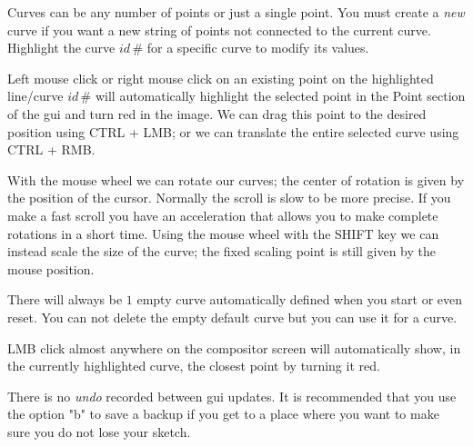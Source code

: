 Curves can be any number of points or just a single point.
You must create a \textit{new} curve if you want a new string of points not connected to the current curve.
Highlight the curve $id\,\#$ for a specific curve to modify its values.
{Left mouse click or right mouse click on an existing point on the highlighted line/curve $id\,\#$ will automatically highlight the selected point in the Point section of the gui and turn red in the image. We can drag this point to the desired position using CTRL + LMB; or we can translate the entire selected curve using CTRL + RMB.
	
With the mouse wheel we can rotate our curves; the center of rotation is given by the position of the cursor. Normally the scroll is slow to be more precise. If you make a fast scroll you have an acceleration that allows you to make complete rotations in a short time. Using the mouse wheel with the SHIFT key we can instead scale the size of the curve; the fixed scaling point is still given by the mouse position. 

There will always be $1$ empty curve automatically defined when you start or even reset.
You can not delete the empty default curve but you can use it for a curve.

LMB click almost anywhere on the compositor screen will automatically show, in the currently highlighted curve, the closest point by turning it red.

There is no \textit{undo} recorded between gui updates. It is recommended that you use the option "b" to save a backup if you get to a place where you want to make sure you do not lose your sketch.

}
